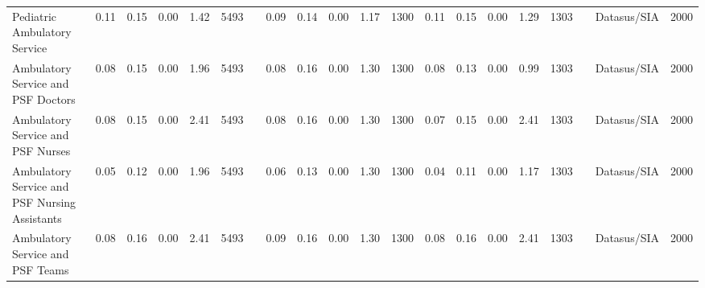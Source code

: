 \begin{sidewaystable}
\begin{table}[H]
\begin{footnotesize}
\begin{center}
{\begin{threeparttable}[b]
\begin{tabular}{rrrrrrrrrrrrrrrrrrrr}
    \multicolumn{1}{l}{Pediatric Ambulatory Service} & \multicolumn{1}{c}{0.11} & \multicolumn{1}{c}{0.15} & \multicolumn{1}{c}{0.00} & \multicolumn{1}{c}{1.42} & \multicolumn{1}{c}{5493} &       & \multicolumn{1}{c}{0.09} & \multicolumn{1}{c}{0.14} & \multicolumn{1}{c}{0.00} & \multicolumn{1}{c}{1.17} & \multicolumn{1}{c}{1300} & \multicolumn{1}{c}{0.11} & \multicolumn{1}{c}{0.15} & \multicolumn{1}{c}{0.00} & \multicolumn{1}{c}{1.29} & \multicolumn{1}{c}{1303} &       & \multicolumn{1}{c}{Datasus/SIA} & \multicolumn{1}{c}{2000} \\
    \multicolumn{1}{l}{Ambulatory Service and PSF Doctors} & \multicolumn{1}{c}{0.08} & \multicolumn{1}{c}{0.15} & \multicolumn{1}{c}{0.00} & \multicolumn{1}{c}{1.96} & \multicolumn{1}{c}{5493} &       & \multicolumn{1}{c}{0.08} & \multicolumn{1}{c}{0.16} & \multicolumn{1}{c}{0.00} & \multicolumn{1}{c}{1.30} & \multicolumn{1}{c}{1300} & \multicolumn{1}{c}{0.08} & \multicolumn{1}{c}{0.13} & \multicolumn{1}{c}{0.00} & \multicolumn{1}{c}{0.99} & \multicolumn{1}{c}{1303} &       & \multicolumn{1}{c}{Datasus/SIA} & \multicolumn{1}{c}{2000} \\
    \multicolumn{1}{l}{Ambulatory Service and PSF Nurses} & \multicolumn{1}{c}{0.08} & \multicolumn{1}{c}{0.15} & \multicolumn{1}{c}{0.00} & \multicolumn{1}{c}{2.41} & \multicolumn{1}{c}{5493} &       & \multicolumn{1}{c}{0.08} & \multicolumn{1}{c}{0.16} & \multicolumn{1}{c}{0.00} & \multicolumn{1}{c}{1.30} & \multicolumn{1}{c}{1300} & \multicolumn{1}{c}{0.07} & \multicolumn{1}{c}{0.15} & \multicolumn{1}{c}{0.00} & \multicolumn{1}{c}{2.41} & \multicolumn{1}{c}{1303} &       & \multicolumn{1}{c}{Datasus/SIA} & \multicolumn{1}{c}{2000} \\
    \multicolumn{1}{l}{Ambulatory Service and PSF Nursing Assistants} & \multicolumn{1}{c}{0.05} & \multicolumn{1}{c}{0.12} & \multicolumn{1}{c}{0.00} & \multicolumn{1}{c}{1.96} & \multicolumn{1}{c}{5493} &       & \multicolumn{1}{c}{0.06} & \multicolumn{1}{c}{0.13} & \multicolumn{1}{c}{0.00} & \multicolumn{1}{c}{1.30} & \multicolumn{1}{c}{1300} & \multicolumn{1}{c}{0.04} & \multicolumn{1}{c}{0.11} & \multicolumn{1}{c}{0.00} & \multicolumn{1}{c}{1.17} & \multicolumn{1}{c}{1303} &       & \multicolumn{1}{c}{Datasus/SIA} & \multicolumn{1}{c}{2000} \\
    \multicolumn{1}{l}{Ambulatory Service and PSF Teams} & \multicolumn{1}{c}{0.08} & \multicolumn{1}{c}{0.16} & \multicolumn{1}{c}{0.00} & \multicolumn{1}{c}{2.41} & \multicolumn{1}{c}{5493} &       & \multicolumn{1}{c}{0.09} & \multicolumn{1}{c}{0.16} & \multicolumn{1}{c}{0.00} & \multicolumn{1}{c}{1.30} & \multicolumn{1}{c}{1300} & \multicolumn{1}{c}{0.08} & \multicolumn{1}{c}{0.16} & \multicolumn{1}{c}{0.00} & \multicolumn{1}{c}{2.41} & \multicolumn{1}{c}{1303} &       & \multicolumn{1}{c}{Datasus/SIA} & \multicolumn{1}{c}{2000} \\

\end{tabular}
\end{threeparttable}}
\end{center}
\end{footnotesize}
\end{table}
\end{sidewaystable}

